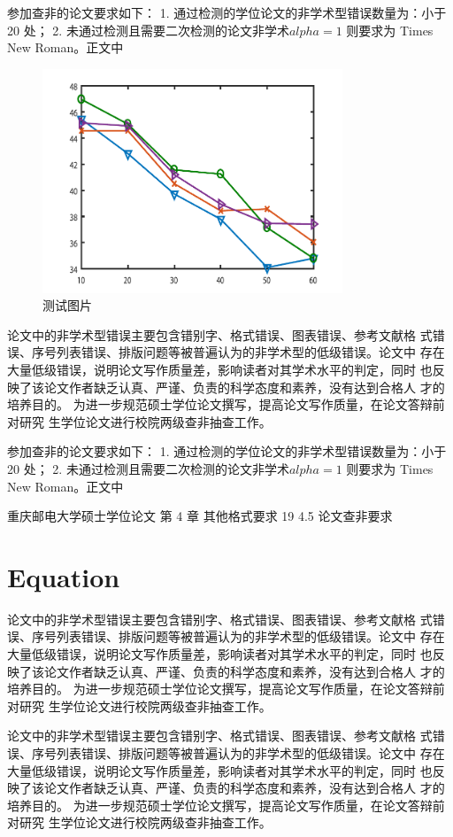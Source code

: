 \documentclass{CQUPTThesis}
\begin{document}
参加查非的论文要求如下：
1. 通过检测的学位论文的非学术型错误数量为：小于 20 处；
2. 未通过检测且需要二次检测的论文非学术$alpha=1$
则要求为 Times New Roman。正文中
\begin{figure}[htp]
\centering
\includegraphics[width=0.8\textwidth]{figures/figure.pdf} 
\caption{测试图片}
\label{1}
\end{figure}
论文中的非学术型错误主要包含错别字、格式错误、图表错误、参考文献格
式错误、序号列表错误、排版问题等被普遍认为的非学术型的低级错误。论文中
存在大量低级错误，说明论文写作质量差，影响读者对其学术水平的判定，同时
也反映了该论文作者缺乏认真、严谨、负责的科学态度和素养，没有达到合格人
才的培养目的。
为进一步规范硕士学位论文撰写，提高论文写作质量，在论文答辩前对研究
生学位论文进行校院两级查非抽查工作。


参加查非的论文要求如下：
1. 通过检测的学位论文的非学术型错误数量为：小于 20 处；
2. 未通过检测且需要二次检测的论文非学术$alpha=1$
则要求为 Times New Roman。正文中

重庆邮电大学硕士学位论文 第 4 章 其他格式要求
19
4.5 论文查非要求

\chapter{Equation}
论文中的非学术型错误主要包含错别字、格式错误、图表错误、参考文献格
式错误、序号列表错误、排版问题等被普遍认为的非学术型的低级错误。论文中
存在大量低级错误，说明论文写作质量差，影响读者对其学术水平的判定，同时
也反映了该论文作者缺乏认真、严谨、负责的科学态度和素养，没有达到合格人
才的培养目的。
为进一步规范硕士学位论文撰写，提高论文写作质量，在论文答辩前对研究
生学位论文进行校院两级查非抽查工作。

论文中的非学术型错误主要包含错别字、格式错误、图表错误、参考文献格
式错误、序号列表错误、排版问题等被普遍认为的非学术型的低级错误。论文中
存在大量低级错误，说明论文写作质量差，影响读者对其学术水平的判定，同时
也反映了该论文作者缺乏认真、严谨、负责的科学态度和素养，没有达到合格人
才的培养目的。
为进一步规范硕士学位论文撰写，提高论文写作质量，在论文答辩前对研究
生学位论文进行校院两级查非抽查工作。
\end{document}
